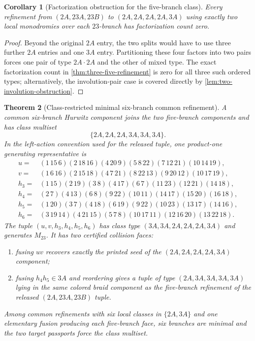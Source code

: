 \documentclass[11pt]{article}
\newtheorem{theorem}{Theorem}[section]
\newtheorem{corollary}[theorem]{Corollary}
\theoremstyle{remark}
\begin{document}
\begin{corollary}[Factorization obstruction for the five-branch class]\label{cor:refinement-obstruction}
Every refinement from $(2A,23A,23B)$ to $(2A,2A,2A,2A,3A)$ using exactly two local monodromies over each $23$-branch has factorization count zero.
\end{corollary}

\begin{proof}
Beyond the original $2A$ entry, the two splits would have to use three further $2A$ entries and one $3A$ entry.  Partitioning these four factors into two pairs forces one pair of type $2A\cdot2A$ and the other of mixed type.  The exact factorization count in \cref{thm:three-five-refinement} is zero for all three such ordered types; alternatively, the involution-pair case is covered directly by \cref{lem:two-involution-obstruction}.
\end{proof}

\begin{theorem}[Class-restricted minimal six-branch common refinement]\label{thm:six-bridge}
A common six-branch Hurwitz component joins the two five-branch components and has class multiset
\[
 \boxed{\{2A,2A,2A,3A,3A,3A\}.}
\]
In the left-action convention used for the released tuple, one product-one generating representative is
\begin{align*}
 u={}&(1\,15\,6)(2\,18\,16)(4\,20\,9)(5\,8\,22)(7\,12\,21)(10\,14\,19),\\
 v={}&(1\,6\,16)(2\,15\,18)(4\,7\,21)(8\,22\,13)(9\,20\,12)(10\,17\,19),\\
 h_3={}&(1\,15)(2\,19)(3\,8)(4\,17)(6\,7)(11\,23)(12\,21)(14\,18),\\
 h_4={}&(2\,7)(4\,13)(6\,8)(9\,22)(10\,11)(14\,17)(15\,20)(16\,18),\\
 h_5={}&(1\,20)(3\,7)(4\,18)(6\,19)(9\,22)(10\,23)(13\,17)(14\,16),\\
 h_6={}&(3\,19\,14)(4\,21\,15)(5\,7\,8)(10\,17\,11)(12\,16\,20)(13\,22\,18).
\end{align*}
The tuple $(u,v,h_3,h_4,h_5,h_6)$ has class type $(3A,3A,2A,2A,2A,3A)$ and generates $M_{23}$.  It has two certified collision faces:
\begin{enumerate}[label=\textnormal{(\alph*)},leftmargin=2.4em]
\item fusing $uv$ recovers exactly the printed seed of the $(2A,2A,2A,2A,3A)$ component;
\item fusing $h_4h_5\in3A$ and reordering gives a tuple of type $(2A,3A,3A,3A,3A)$ lying in the same colored braid component as the five-branch refinement of the released $(2A,23A,23B)$ tuple.
\end{enumerate}
Among common refinements with six local classes in $\{2A,3A\}$ and one elementary fusion producing each five-branch face, six branches are minimal and the two target passports force the class multiset.
\end{theorem}
\end{document}

